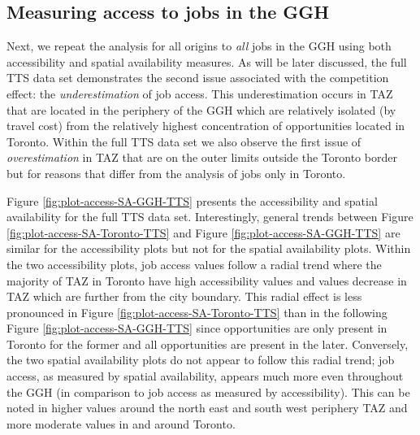 \documentclass[]{elsarticle} %
\begin{document}
\newpage

\hypertarget{measuring-access-to-jobs-in-the-ggh}{%
\subsection{Measuring access to jobs in the
GGH}\label{measuring-access-to-jobs-in-the-ggh}}

Next, we repeat the analysis for all origins to \emph{all} jobs in the
GGH using both accessibility and spatial availability measures. As will
be later discussed, the full TTS data set demonstrates the second issue
associated with the competition effect: the \emph{underestimation} of
job access. This underestimation occurs in TAZ that are located in the
periphery of the GGH which are relatively isolated (by travel cost) from
the relatively highest concentration of opportunities located in
Toronto. Within the full TTS data set we also observe the first issue of
\emph{overestimation} in TAZ that are on the outer limits outside the
Toronto border but for reasons that differ from the analysis of jobs
only in Toronto.

Figure \ref{fig:plot-access-SA-GGH-TTS} presents the accessibility and
spatial availability for the full TTS data set. Interestingly, general
trends between Figure \ref{fig:plot-access-SA-Toronto-TTS} and Figure
\ref{fig:plot-access-SA-GGH-TTS} are similar for the accessibility plots
but not for the spatial availability plots. Within the two accessibility
plots, job access values follow a radial trend where the majority of TAZ
in Toronto have high accessibility values and values decrease in TAZ
which are further from the city boundary. This radial effect is less
pronounced in Figure \ref{fig:plot-access-SA-Toronto-TTS} than in the
following Figure \ref{fig:plot-access-SA-GGH-TTS} since opportunities
are only present in Toronto for the former and all opportunities are
present in the later. Conversely, the two spatial availability plots do
not appear to follow this radial trend; job access, as measured by
spatial availability, appears much more even throughout the GGH (in
comparison to job access as measured by accessibility). This can be
noted in higher values around the north east and south west periphery
TAZ and more moderate values in and around Toronto.
\end{document}
